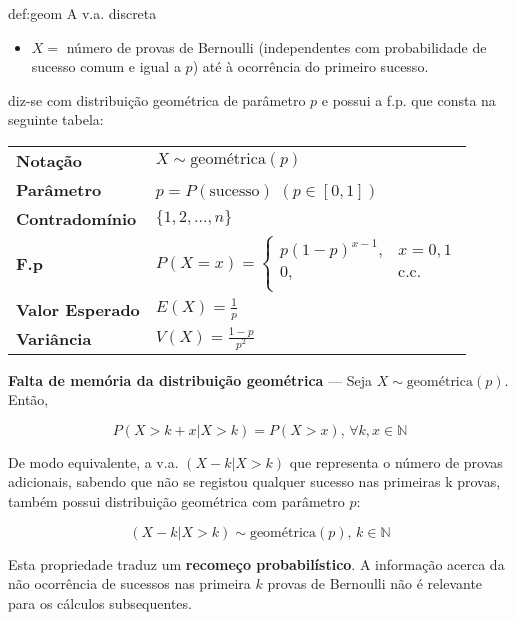 \begin{theo}{def:geom}\label{def:geom}
\noindent A v.a. discreta

\begin{itemize}
    \item $X =$ número de provas de Bernoulli (independentes com probabilidade de sucesso comum e igual a $p$) até à ocorrência do primeiro sucesso.
\end{itemize}

\noindent diz-se com distribuição geométrica de parâmetro $p$ e possui a f.p. que consta na seguinte tabela:

\vspace{1 em}
\begin{center}
\begin{tabular}{p{4cm}p{8cm}}
\toprule
\textbf{Notação} & $X \sim \text{geométrica}(p)$\\
\addlinespace
\textbf{Parâmetro} & $p = P(\text{sucesso})$ $(p \in [0,1])$\\
\addlinespace
\textbf{Contradomínio} & $\{1,2, \dots, n\}$\\
\addlinespace
\textbf{F.p} & $P(X = x)= \left\{
                                \begin{array}{ll}
                                       p(1 - p)^{x-1}, & x = 0,1\\
                                       0, & \text{c.c.}\\
                                \end{array} 
                          \right.$\\
\addlinespace
\textbf{Valor Esperado} & $E(X) = \frac{1}{p}$\\
\addlinespace
\textbf{Variância} & $V(X) = \frac{1 - p}{p^2}$\\
\bottomrule
\end{tabular}
\end{center}

\noindent \textbf{Falta de memória da distribuição geométrica} --- Seja $X \sim \text{geométrica}(p)$. Então,

$$
    \boxed{P(X > k + x | X > k) = P(X > x),\, \forall k,x \in \mathbb{N}}
$$

\noindent De modo equivalente, a v.a. $(X - k | X > k)$ que representa o número de provas adicionais, sabendo que não se registou qualquer sucesso nas primeiras k provas, também possui distribuição geométrica com parâmetro $p$:

$$
\boxed{(X - k | X > k) \sim \text{geométrica}(p),\, k \in \mathbb{N}}
$$

\noindent Esta propriedade traduz um \textbf{recomeço probabilístico}. A informação acerca da não ocorrência de sucessos nas primeira $k$ provas de Bernoulli não é relevante para os cálculos subsequentes.

\vspace{0.5 em}
\end{theo}


